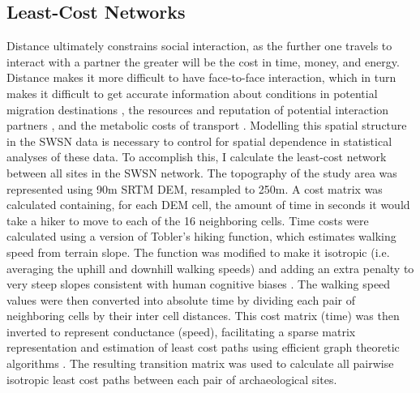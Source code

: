 \documentclass[10pt]{iopart}
\begin{document}
\subsection*{Least-Cost Networks}
Distance ultimately constrains social interaction, as the further one travels to interact with a partner the greater will be the cost in time, money, and energy. Distance makes it more difficult to have face-to-face interaction, which in turn makes it difficult to get accurate information about conditions in potential migration destinations \parencite{Anderies2011a}, the resources and reputation of potential interaction partners \parencite{Fafchamps2007}, and the metabolic costs of transport \parencite{Drennan1984}. Modelling this spatial structure in the SWSN data is necessary to control for spatial dependence in statistical analyses of these data. To accomplish this, I calculate the least-cost network between all sites in the SWSN network. The topography of the study area was represented using 90m SRTM DEM, resampled to 250m. A cost matrix was calculated containing, for each DEM cell, the amount of time in seconds it would take a hiker to move to each of the 16 neighboring cells. Time costs were calculated using a version of Tobler's hiking function, which estimates walking speed from terrain slope. The function was modified to make it isotropic (i.e. averaging the uphill and downhill walking speeds) and adding an extra penalty to very steep slopes consistent with human cognitive biases \parencite{Pingel2010}. The walking speed values were then converted into absolute time by dividing each pair of neighboring cells by their inter cell distances. This cost matrix (time) was then inverted to represent conductance (speed), facilitating a sparse matrix representation and estimation of least cost paths using efficient graph theoretic algorithms \parencite{Etten2014}. The resulting transition matrix was used to calculate all pairwise isotropic least cost paths between each pair of archaeological sites. 
\end{document}
